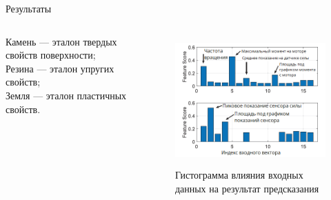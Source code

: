 \begin{frame}[t]{Результаты}
\begin{columns}[T,onlytextwidth]
\begin{column}{0.49\textwidth}
            Камень --- эталон твердых свойств поверхности;\\
            Резина --- эталон упругих свойств;\\
            Земля --- эталон пластичных свойств.
        \end{column}
        \begin{column}{0.49\textwidth}
            \begin{figure}[H]
                \centering\includegraphics[height=5cm,width=1\textwidth,keepaspectratio]{../images/s_shape_leg/feature_score.png}
                \caption*{Гистограмма влияния входных данных на результат предсказания}
            \end{figure}
        \end{column}
    \end{columns}
\end{frame}

